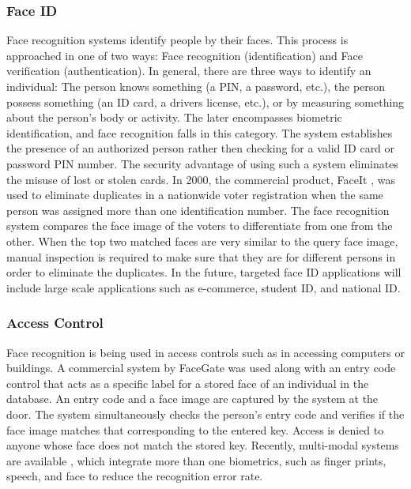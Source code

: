\subsubsection{Face ID} Face recognition systems identify people by
their faces. This process is approached in one of two ways:  Face
recognition (identification) and Face verification (authentication).
In general, there are three ways to identify an individual: The
person knows something (a PIN, a password, etc.), the person possess
something (an ID card, a drivers license, etc.), or by measuring
something about the person's body or activity. The later encompasses
biometric identification, and face recognition falls in this
category. The system establishes the presence of an authorized
person rather then checking for a valid ID card or password PIN
number. The security advantage of using such a system eliminates the
misuse of lost or stolen cards. In 2000, the commercial product,
FaceIt \cite{identix}, was used to eliminate duplicates in a
nationwide voter registration when the same person was assigned more
than one identification number. The face recognition system compares
the face image of the voters to differentiate from one from the
other. When the top two matched faces are very similar to the query
face image, manual inspection is required to make sure that they are
for different persons in order to eliminate the duplicates. In the
future, targeted face ID applications will include large scale
applications such as e-commerce, student ID, and national ID.

\subsubsection{Access Control} Face recognition is being used in
access controls such as in accessing computers or buildings. A
commercial system by FaceGate \cite{premiereletct} was used along
with an entry code control that acts as a specific label for a
stored face of an individual in the database. An entry code and a
face image are captured by the system at the door. The system
simultaneously checks the person's entry code and verifies if the
face image matches that corresponding to the entered key. Access is
denied to anyone whose face does not match the stored key. Recently,
multi-modal systems are available \cite{facekey}, which integrate
more than one biometrics, such as finger prints, speech, and face to
reduce the recognition error rate.

